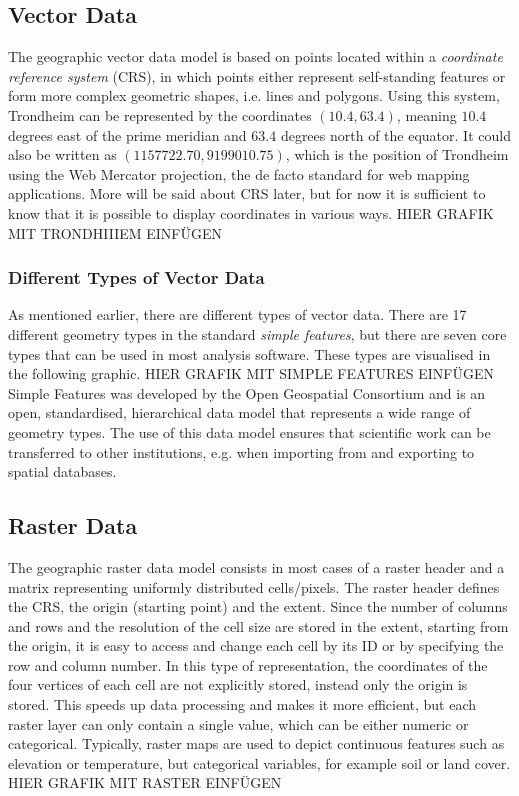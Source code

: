 \documentclass[12pt]{book}
\begin{document}
\subsection{Vector Data}
The geographic vector data model is based on points located within a \textit{coordinate reference system} (CRS), in which points either represent self-standing features or form more complex geometric shapes, i.e. lines and polygons. Using this system, Trondheim can be represented by the coordinates $\left(10.4, 63.4\right)$, meaning $10.4$ degrees east of the prime meridian and $63.4$ degrees north of the equator. It could also be written as $\left(1157722.70, 9199010.75\right)$, which is the position of Trondheim using the Web Mercator projection, the de facto standard for web mapping applications. More will be said about CRS later, but for now it is sufficient to know that it is possible to display coordinates in various ways.
HIER GRAFIK MIT TRONDHIIIEM EINFÜGEN
\subsubsection*{Different Types of Vector Data}
As mentioned earlier, there are different types of vector data. There are 17 different geometry types in the standard \textit{simple features}, but there are seven core types that can be used in most analysis software. These types are visualised in the following graphic.
HIER GRAFIK MIT SIMPLE FEATURES EINFÜGEN
Simple Features was developed by the Open Geospatial Consortium and is an open, standardised, hierarchical data model that represents a wide range of geometry types. The use of this data model ensures that scientific work can be transferred to other institutions, e.g. when importing from and exporting to spatial databases. 
\subsection{Raster Data}
The geographic raster data model consists in most cases of a raster header and a matrix representing uniformly distributed cells/pixels. The raster header defines the CRS, the origin (starting point) and the extent. Since the number of columns and rows and the resolution of the cell size are stored in the extent, starting from the origin, it is easy to access and change each cell by its ID or by specifying the row and column number. In this type of representation, the coordinates of the four vertices of each cell are not explicitly stored, instead only the origin is stored. This speeds up data processing and makes it more efficient, but each raster layer can only contain a single value, which can be either numeric or categorical. Typically, raster maps are used to depict continuous features such as elevation or temperature, but categorical variables, for example soil or land cover.
HIER GRAFIK MIT RASTER EINFÜGEN
\end{document}

